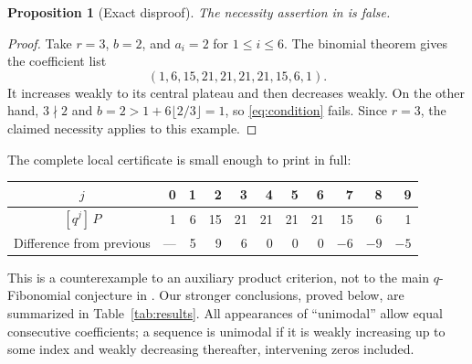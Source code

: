\documentclass[11pt]{article}
\theoremstyle{research}
\newtheorem{proposition}[theorem]{Proposition}
\theoremstyle{definition}
\newcommand{\coef}[2]{[q^{#1}]\,#2}
\numberwithin{equation}{section}
\begin{document}
\begin{proposition}[Exact disproof]\label{prop:counterexample}
The necessity assertion in \cite[Conjecture 5.4]{CIMSY} is false.
\end{proposition}
\begin{proof}
Take $r=3$, $b=2$, and $a_i=2$ for $1\le i\le6$.
The binomial theorem gives the coefficient list
\[
 (1,6,15,21,21,21,21,15,6,1).
\]
It increases weakly to its central plateau and then decreases weakly.
On the other hand, $3\nmid2$ and
$b=2>1+6\lfloor2/3\rfloor=1$, so \eqref{eq:condition} fails.
Since $r=3$, the claimed necessity applies to this example.
\end{proof}

The complete local certificate is small enough to print in full:
\begin{center}
\small
\begin{tabular}{c@{\quad}rrrrrrrrrr}
\toprule
$j$ &0&1&2&3&4&5&6&7&8&9\\
\midrule
$\coef jP$&1&6&15&21&21&21&21&15&6&1\\
Difference from previous&---&5&9&6&0&0&0&$-6$&$-9$&$-5$\\
\bottomrule
\end{tabular}
\end{center}

This is a counterexample to an auxiliary product criterion, not to the
main $q$-Fibonomial conjecture in \cite{CIMSY}.
Our stronger conclusions, proved below, are summarized in
Table~\ref{tab:results}. All appearances of ``unimodal'' allow equal
consecutive coefficients; a sequence is unimodal if it is weakly increasing
up to some index and weakly decreasing thereafter, intervening zeros included.
\end{document}
